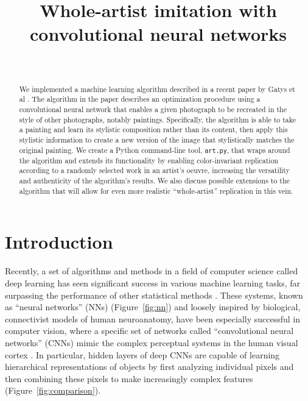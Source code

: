 \documentclass[11pt,letterpaper,journal]{IEEEtran}
\begin{document}

\title{Whole-artist imitation with convolutional neural networks}
\author{\\
}
\maketitle

\begin{abstract}
We implemented a machine learning algorithm described in a recent paper by
Gatys et al \cite{gatys15}. The algorithm in the paper describes an
optimization procedure using a convolutional neural network that enables a
given photograph to be recreated in the style of other photographs, notably
paintings. Specifically, the algorithm is able to take a painting and learn its
stylistic composition rather than its content, then apply this stylistic
information to create a new version of the image that stylistically matches the
original painting. We create a Python command-line tool, \texttt{art.py}, that
wraps around the algorithm and extends its functionality by enabling
color-invariant replication according to a randomly selected work in an
artist's oeuvre, increasing the versatility and authenticity of the algorithm's
results. We also discuss possible extensions to the algorithm that will allow
for even more realistic ``whole-artist'' replication in this vein.
\end{abstract}

\section{Introduction}

Recently, a set of algorithms and methods in a field of computer science called
deep learning has seen significant success in various machine learning tasks,
far surpassing the performance of other statistical methods \cite{lecun2015}.
These systems, known as ``neural networks'' (NNs) (Figure~\ref{fig:nn}) and
loosely inspired by biological, connectivist models of human neuroanatomy, have
been especially successful in computer vision, where a specific set of networks
called ``convolutional neural networks'' (CNNs) mimic the complex perceptual
systems in the human visual cortex \cite{riesenhuber99}. In particular, hidden
layers of deep CNNs are capable of learning hierarchical representations of
objects by first analyzing individual pixels and then combining these pixels to
make increasingly complex features (Figure~\ref{fig:comparison}).
\end{document}
